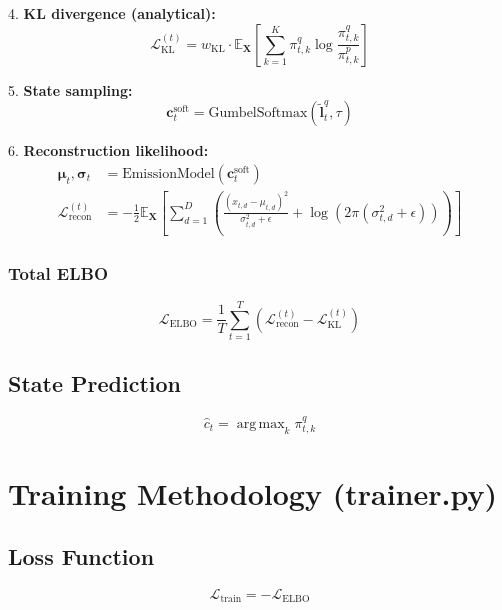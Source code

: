 \documentclass[11pt]{article}
\DeclareMathOperator*{\argmax}{arg\,max}
\begin{document}
4. \textbf{KL divergence (analytical):}
\begin{equation}
\mathcal{L}_{\text{KL}}^{(t)} = w_{\text{KL}} \cdot \mathbb{E}_{\mathbf{X}}\left[\sum_{k=1}^K \pi_{t,k}^q \log\frac{\pi_{t,k}^q}{\pi_{t,k}^p}\right]
\end{equation}

5. \textbf{State sampling:}
\begin{equation}
\mathbf{c}_t^{\text{soft}} = \text{GumbelSoftmax}(\tilde{\mathbf{l}}_t^q, \tau)
\end{equation}

6. \textbf{Reconstruction likelihood:}
\begin{align}
\bm{\mu}_t, \bm{\sigma}_t &= \text{EmissionModel}(\mathbf{c}_t^{\text{soft}}) \\
\mathcal{L}_{\text{recon}}^{(t)} &= -\frac{1}{2}\mathbb{E}_{\mathbf{X}}\left[\sum_{d=1}^D \left(\frac{(x_{t,d} - \mu_{t,d})^2}{\sigma_{t,d}^2 + \epsilon} + \log(2\pi(\sigma_{t,d}^2 + \epsilon))\right)\right]
\end{align}

\subsubsection{Total ELBO}
\begin{equation}
\mathcal{L}_{\text{ELBO}} = \frac{1}{T}\sum_{t=1}^T \left(\mathcal{L}_{\text{recon}}^{(t)} - \mathcal{L}_{\text{KL}}^{(t)}\right)
\end{equation}

\subsection{State Prediction}
\begin{equation}
\hat{c}_t = \argmax_{k} \pi_{t,k}^q
\end{equation}

\section{Training Methodology (trainer.py)}

\subsection{Loss Function}
\begin{equation}
\mathcal{L}_{\text{train}} = -\mathcal{L}_{\text{ELBO}}
\end{equation}
\end{document}
